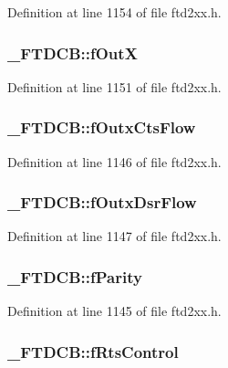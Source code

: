 Definition at line 1154 of file ftd2xx.h.\hypertarget{struct__FTDCB_ad69a6d309c4e2f95588179e818a87c9d}{
\subsubsection[{fOutX}]{ {\bf \_\-FTDCB::fOutX}}}
\label{struct__FTDCB_ad69a6d309c4e2f95588179e818a87c9d}


Definition at line 1151 of file ftd2xx.h.\hypertarget{struct__FTDCB_a3e5166713d0405820849e27ba554ba7d}{
\subsubsection[{fOutxCtsFlow}]{ {\bf \_\-FTDCB::fOutxCtsFlow}}}
\label{struct__FTDCB_a3e5166713d0405820849e27ba554ba7d}


Definition at line 1146 of file ftd2xx.h.\hypertarget{struct__FTDCB_af5ce76c2d358a419e028f8879aca3dcb}{
\subsubsection[{fOutxDsrFlow}]{ {\bf \_\-FTDCB::fOutxDsrFlow}}}
\label{struct__FTDCB_af5ce76c2d358a419e028f8879aca3dcb}


Definition at line 1147 of file ftd2xx.h.\hypertarget{struct__FTDCB_a8a81323a9b1ba34bd0cc2ae97d898c73}{
\subsubsection[{fParity}]{ {\bf \_\-FTDCB::fParity}}}
\label{struct__FTDCB_a8a81323a9b1ba34bd0cc2ae97d898c73}


Definition at line 1145 of file ftd2xx.h.\hypertarget{struct__FTDCB_a482e77565cf032ba8024948e3546b31b}{
\subsubsection[{fRtsControl}]{ {\bf \_\-FTDCB::fRtsControl}}}
\label{struct__FTDCB_a482e77565cf032ba8024948e3546b31b}


